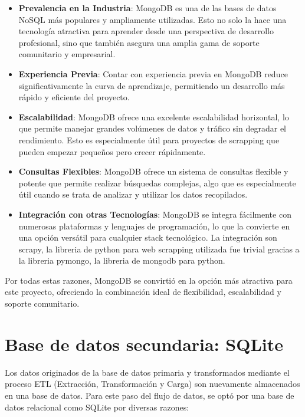 \begin{itemize}
\item \textbf{Prevalencia en la Industria}: MongoDB es una de las bases de datos NoSQL más populares y ampliamente utilizadas. Esto no solo la hace una tecnología atractiva para aprender desde una perspectiva de desarrollo profesional, sino que también asegura una amplia gama de soporte comunitario y empresarial.

\item \textbf{Experiencia Previa}: Contar con experiencia previa en MongoDB reduce significativamente la curva de aprendizaje, permitiendo un desarrollo más rápido y eficiente del proyecto.

\item \textbf{Escalabilidad}: MongoDB ofrece una excelente escalabilidad horizontal, lo que permite manejar grandes volúmenes de datos y tráfico sin degradar el rendimiento. Esto es especialmente útil para proyectos de scrapping que pueden empezar pequeños pero crecer rápidamente.

\item \textbf{Consultas Flexibles}: MongoDB ofrece un sistema de consultas flexible y potente que permite realizar búsquedas complejas, algo que es especialmente útil cuando se trata de analizar y utilizar los datos recopilados.

\item \textbf{Integración con otras Tecnologías}: MongoDB se integra fácilmente con numerosas plataformas y lenguajes de programación, lo que la convierte en una opción versátil para cualquier stack tecnológico. La integración son scrapy, la libreria de python para web scrapping utilizada fue trivial gracias a la libreria pymongo, la libreria de mongodb para python.
\end{itemize}

Por todas estas razones, MongoDB se convirtió en la opción más atractiva para este proyecto, ofreciendo la combinación ideal de flexibilidad, escalabilidad y soporte comunitario.

\section{Base de datos secundaria: SQLite}

Los datos originados de la base de datos primaria y transformados mediante el proceso ETL (Extracción, Transformación y Carga) son nuevamente almacenados en una base de datos. Para este paso del flujo de datos, se optó por una base de datos relacional como SQLite por diversas razones:

